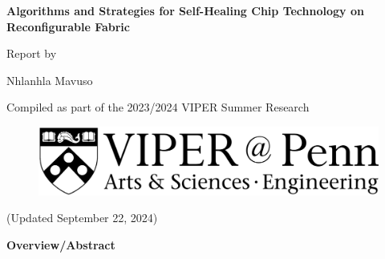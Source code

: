\documentclass[11pt]{report}
\begin{document}
\begin{mainf} %

\begin{Huge}
\singlespacing
    \begin{center}
    \textbf{Algorithms and Strategies for Self-Healing Chip Technology on Reconfigurable Fabric}
\end{center}
\end{Huge}



\;

\begin{center}
    Report by

    Nhlanhla Mavuso
    
\end{center} 

\;

\begin{center}
    Compiled as part of the 2023/2024 VIPER Summer Research 
\end{center}

\;

\begin{figure}[H]
    \centering
    \includegraphics[width=0.5\linewidth]{viper_logo.png}
    \label{fig:enter-label}
\end{figure}

\begin{center}
    (Updated September 22, 2024)
\end{center}


\newpage



\textbf{Overview/Abstract}


\end{mainf}
\end{document}
